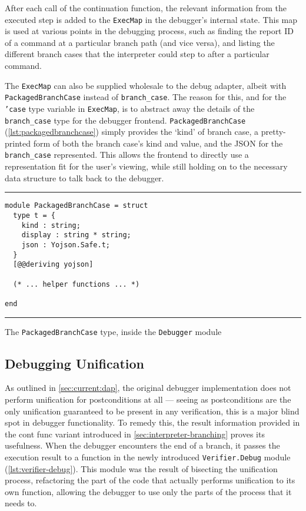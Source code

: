 After each call of the continuation function, the relevant information from
the executed step is added to the \texttt{ExecMap} in the debugger's internal
state. This map is used at various points in the debugging process, such as
finding the report ID of a command at a particular branch path (and vice versa),
and listing the different branch cases that the interpreter could step to after
a particular command.

The \texttt{ExecMap} can also be supplied wholesale to the debug adapter,
albeit with \texttt{PackagedBranchCase} instead of \texttt{branch\_case}.
The reason for this, and for the \texttt{'case} type variable in
\texttt{ExecMap}, is to abstract away the details of the \texttt{branch\_case}
type for the debugger frontend. \texttt{PackagedBranchCase}
(\autoref{lst:packagedbranchcase}) simply provides the `kind' of branch case,
a pretty-printed form of both the branch case's kind and value, and the JSON
for the \texttt{branch\_case} represented. This allows the frontend to directly
use a representation fit for the user's viewing, while still holding on to the
necessary data structure to talk back to the debugger.

\begin{listing}[!ht]
\noindent\rule{\textwidth}{0.5pt}
\vspace{-0.6cm}
\begin{verbatim}
module PackagedBranchCase = struct
  type t = {
    kind : string;
    display : string * string;
    json : Yojson.Safe.t;
  }
  [@@deriving yojson]

  (* ... helper functions ... *)

end
\end{verbatim}
\vspace{-0.4cm}
\noindent\rule{\textwidth}{0.5pt}
\vspace{-0.6cm}
\caption{The \texttt{PackagedBranchCase} type, inside the \texttt{Debugger} module}
\label{lst:packagedbranchcase}
\end{listing}


\subsection{Debugging Unification}%
\label{sec:debug-unify}

As outlined in \autoref{sec:current:dap}, the original debugger implementation
does not perform unification for postconditions at all --- seeing as
postconditions are the only unification guaranteed to be present in any
verification, this is a major blind spot in debugger functionality. To remedy
this, the result information provided in the \texttt{} cont func variant
introduced in \autoref{sec:interpreter-branching} proves its usefulness.
When the debugger encounters the end of a branch, it passes the execution
result to a function in the newly introduced \texttt{Verifier.Debug} module
(\autoref{lst:verifier-debug}). This module was the result of bisecting the
unification process, refactoring the part of the code that actually performs
unification to its own function, allowing the debugger to use only the parts
of the process that it needs to.

